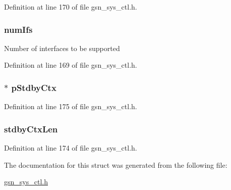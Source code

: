 Definition at line 170 of file gsn\_\-sys\_\-ctl.h.

\hypertarget{a00247_a5d8ffa77e8421c84687b597a75ed84e7}{
\subsubsection[{numIfs}]{ {\bf numIfs}}}
\label{a00247_a5d8ffa77e8421c84687b597a75ed84e7}
Number of interfaces to be supported 

Definition at line 169 of file gsn\_\-sys\_\-ctl.h.

\hypertarget{a00247_a8945797439cfd2e3c2039f70561948c7}{
\subsubsection[{pStdbyCtx}]{$\ast$ {\bf pStdbyCtx}}}
\label{a00247_a8945797439cfd2e3c2039f70561948c7}


Definition at line 175 of file gsn\_\-sys\_\-ctl.h.

\hypertarget{a00247_a5ef40f19e5c99b132dc4a5f1b59d9529}{
\subsubsection[{stdbyCtxLen}]{ {\bf stdbyCtxLen}}}
\label{a00247_a5ef40f19e5c99b132dc4a5f1b59d9529}


Definition at line 174 of file gsn\_\-sys\_\-ctl.h.



The documentation for this struct was generated from the following file:\begin{DoxyCompactItemize}
\item 
\hyperlink{a00592}{gsn\_\-sys\_\-ctl.h}\end{DoxyCompactItemize}

